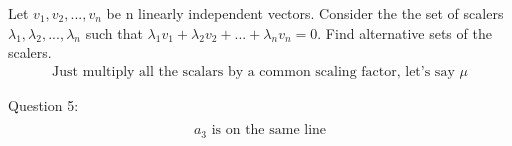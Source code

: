\documentclass{article}
\begin{document}
Let $v_1, v_2, ..., v_n$ be n linearly independent vectors.
Consider the the set of scalers $\lambda_1, \lambda_2, ..., \lambda_n$ such that $\lambda_1 v_1 + \lambda_2 v_2 + ... + \lambda_n v_n = 0$.
Find alternative sets of the scalers.
\begin{align*}
    \textrm{Just multiply all the scalars by a common scaling factor, let's say } \mu
\end{align*}

Question 5:
\begin{align*}
    \textrm{} \\
    a_3 \textrm{ is on the same line}
\end{align*}
\end{document}
